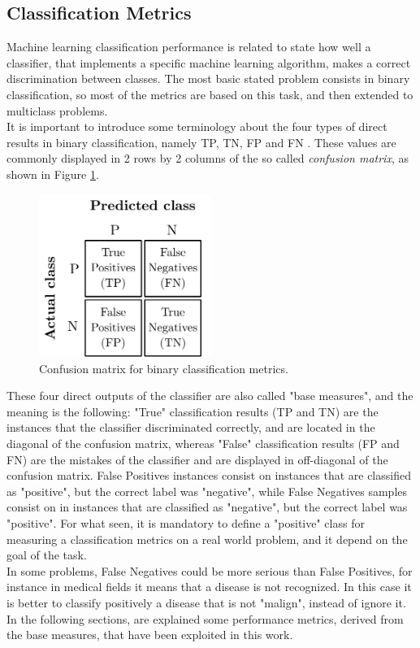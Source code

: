 \subsection{Classification Metrics}

Machine learning classification performance is related to state how well a classifier, that implements a specific machine learning algorithm, makes a correct discrimination between classes. The most basic stated problem consists in binary classification, so most of the metrics are based on this task, and then extended to multiclass problems.\\
It is important to introduce some terminology about the four types of direct results in binary classification, namely \ac{TP}, \ac{TN}, \ac{FP} and \ac{FN} \cite{inproceedings-bin-metrics}. These values are commonly displayed in 2 rows by 2 columns of the so called \textit{confusion matrix}, as shown in Figure \ref{fig:confusion-matrix}. 

\begin{figure}[ht]
	\centering
	\includegraphics[width=0.5\textwidth]{figures/confusion_matrix.pdf}
	\caption{Confusion matrix for binary classification metrics.}
	\label{fig:confusion-matrix}
\end{figure}

These four direct outputs of the classifier are also called "base measures", and the meaning is the following: "True" classification results (\ac{TP} and \ac{TN}) are the instances that the classifier discriminated correctly, and are located in the diagonal of the confusion matrix, whereas "False" classification results (\ac{FP} and \ac{FN}) are the mistakes of the classifier and are displayed in off-diagonal of the confusion matrix. False Positives instances consist on instances that are classified as "positive", but the correct label was "negative", while False Negatives samples consist on in instances that are classified as "negative", but the correct label was "positive". For what seen, it is mandatory to define a "positive" class for measuring a classification metrics on a real world problem, and it depend on the goal of the task.\\
In some problems, False Negatives could be more serious than False Positives, for instance in medical fields it means that a disease is not recognized. In this case it is better to classify positively a disease that is not "malign", instead of ignore it. \\
In the following sections, are explained some performance metrics, derived from the base measures, that have been exploited in this work.

